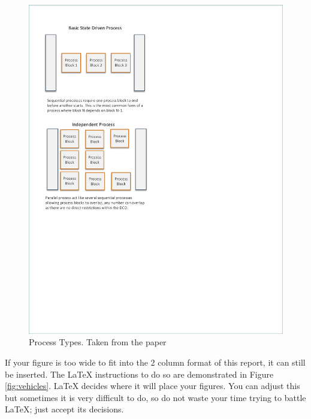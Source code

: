 \documentclass[a4paper,twoside]{article}
\begin{document}
\begin{figure}
	\caption{Process Types.  Taken from the paper \cite{Cummings2017} }\label{fig:class}
	\includegraphics[width=\linewidth]{Images/ProcessTypes}
\end{figure}

If your figure is too wide to fit into the 2 column format of this report, it can still be inserted.  The LaTeX instructions to do so are demonstrated in Figure \ref{fig:vehicles}.  LaTeX decides where it will place your figures.  You can adjust this but sometimes it is very difficult to do, so do not waste your time trying to battle LaTeX; just accept its decisions.
\end{document}
